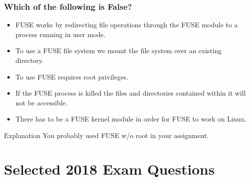 \documentclass{beamer}
\begin{document}
\begin{frame}
  \frametitle{Which of the following is False?}
  \begin{itemize}
    \item FUSE works by redirecting file operations through the FUSE module to a process running in user mode.
    \item To use a FUSE file system we mount the file system over an existing directory.
    \item<alert@2> To use FUSE requires root privileges.
    \item If the FUSE process is killed the files and directories contained within it will not be accessible.
    \item There has to be a FUSE kernel module in order for FUSE to work on Linux.
  \end{itemize}
  \pause
  \begin{block}{Explanation}
    You probably used FUSE w/o root in your assignment.
  \end{block}
\end{frame}

\section{Selected 2018 Exam Questions}
\end{document}
